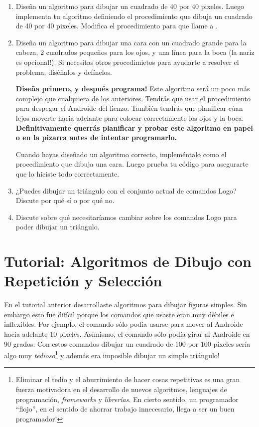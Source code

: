\begin{enumerate}
\item Diseña un algoritmo para dibujar un cuadrado de 40 por 40
  pixeles. Luego implementa tu algoritmo definiendo el procedimiento
   que dibuja un cuadrado de 40 por 40
  pixeles. Modifica el procedimiento  para que llame a
  .

\item Diseña un algoritmo para dibujar una cara con un cuadrado grande
  para la cabeza, 2 cuadrados pequeños para los ojos, y una línea para
  la boca (la nariz es opcional!). Si necesitas otros procedimietos
  para ayudarte a resolver el problema, diséñalos y defínelos.

\textbf{Diseña primero, y después programa!} Este algoritmo será un
poco más complejo que cualquiera de los anteriores. Tendrás que usar
el procedimiento  para despegar el Androide del
lienzo. También tendrás que planificar cúan lejos moverte hacia
adelante para colocar correctamente los ojos y la
boca. \textbf{Definitivamente querrás planificar y probar este
  algoritmo en papel o en la pizarra antes de intentar programarlo.}

Cuando hayas diseñado un algoritmo correcto, impleméntalo como el
procedimiento  que dibuja una cara. Luego prueba tu
código para asegurarte que lo hiciste todo correctamente.

\item ¿Puedes dibujar un triángulo con el conjunto actual de comandos
  Logo? Discute por qué sí o por qué no.

\item Discute sobre qué necesitaríamos cambiar sobre los comandos Logo
  para poder dibujar un triángulo.

\end{enumerate}

\section{Tutorial: Algoritmos de Dibujo con Repetición y Selección}

En el tutorial anterior desarrollaste algoritmos para dibujar figuras
simples. Sin embargo esto fue difícil porque los comandos que usaste
eran muy débiles e inflexibles. Por ejemplo, el comando
 sólo podía usarse para mover al Androide hacia
adelante 10 pixeles. Asímismo, el comando  sólo
podía girar al Androide en 90 grados. Con estos comandos dibujar un
cuadrado de 100 por 100 pixeles sería algo muy
\emph{tedioso}\footnote{Eliminar el tedio y el aburrimiento de hacer
  cosas repetitivas es una gran fuerza motivadora en el desarrollo de
  nuevos algoritmos, lenguajes de programación, \emph{frameworks} y
  \emph{librerías}. En cierto sentido, un programador ``flojo'', en el
  sentido de ahorrar trabajo innecesario, llega a ser un buen
  programador!} y además era imposible dibujar un simple triángulo!

